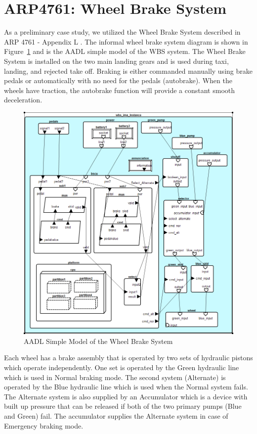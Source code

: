 \section{ARP4761: Wheel Brake System}

As a preliminary case study, we utilized the Wheel Brake System described in ARP 4761 - Appendix L \cite{AIR6110}. The informal wheel brake system diagram is shown in Figure~\ref{fig:wbs_ima} and is the AADL simple model of the WBS system. The Wheel Brake System is installed on the two main landing gears and is used during taxi, landing, and rejected take off. Braking is either commanded manually using brake pedals or automatically with no need for the pedals (autobrake). When the wheels have traction, the autobrake function will provide a constant smooth deceleration. \\


\begin{figure}[h!]
\begin{center}
\includegraphics[scale=.5]{images/Wbs-ima.png}
\caption{AADL Simple Model of the Wheel Brake System }\label{fig:wbs_ima}
\end{center}
\end{figure}

Each wheel has a brake assembly that is operated by two sets of hydraulic pistons which operate independently. One set is operated by the Green hydraulic line which is used in Normal braking mode. The second system (Alternate) is operated by the Blue hydraulic line which is used when the Normal system fails. The Alternate system is also supplied by an Accumulator which is a device with built up pressure that can be released if both of the two primary pumps (Blue and Green) fail. The accumulator supplies the Alternate system in case of Emergency braking mode. 

